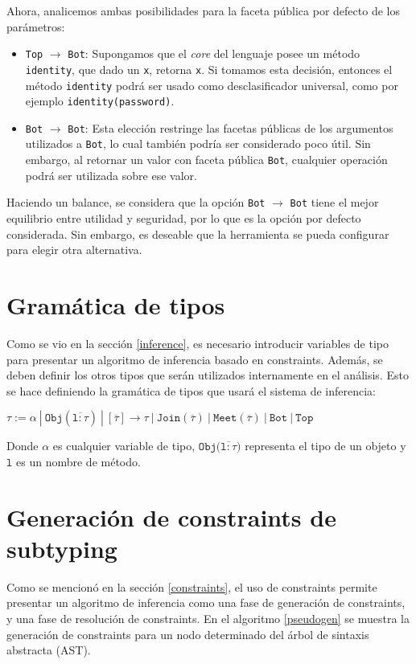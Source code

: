 Ahora, analicemos ambas posibilidades para la faceta pública por defecto de los parámetros:

\begin{itemize}
  \item \texttt{Top} $\rightarrow$ \texttt{Bot}: Supongamos que el \textit{core} del lenguaje posee un método \texttt{identity}, que dado un \texttt{x}, retorna \texttt{x}. Si tomamos esta decisión, entonces el método \texttt{identity} podrá ser usado como desclasificador universal, como por ejemplo \texttt{identity(password)}.
  \item \texttt{Bot} $\rightarrow$ \texttt{Bot}: Esta elección restringe las facetas públicas de los argumentos utilizados a \texttt{Bot}, lo cual también podría ser considerado poco útil. Sin embargo, al retornar un valor con faceta pública \texttt{Bot}, cualquier operación podrá ser utilizada sobre ese valor.
\end{itemize}

Haciendo un balance, se considera que la opción \texttt{Bot} $\rightarrow$ \texttt{Bot} tiene el mejor equilibrio entre utilidad y seguridad, por lo que es la opción por defecto considerada. Sin embargo, es deseable que la herramienta se pueda configurar para elegir otra alternativa.

\section{Gramática de tipos}
Como se vio en la sección \ref{inference}, es necesario introducir variables de tipo para presentar un algoritmo de inferencia basado en constraints. Además, se deben definir los otros tipos que serán utilizados internamente en el análisis. Esto se hace definiendo la gramática de tipos que usará el sistema de inferencia:

  $\mathtt{\tau := \alpha\ |\ Obj(\overline{l: \tau})\ |\ [\overline{\tau}] \rightarrow \tau \ |\ Join(\overline{\tau})\ |\ Meet(\overline{\tau})\ |\ Bot\ |\ Top}$

Donde $\alpha$ es cualquier variable de tipo, $\mathtt{Obj(\overline{l: \tau}})$ representa el tipo de un objeto y $\mathtt{l}$ es un nombre de método.

\section{Generación de constraints de subtyping} \label{propuestaGen}
Como se mencionó en la sección \ref{constraints}, el uso de constraints permite presentar un algoritmo de inferencia como una fase de generación de constraints, y una fase de resolución de constraints. En el algoritmo \ref{pseudogen} se muestra la generación de constraints para un nodo determinado del árbol de sintaxis abstracta (AST).

